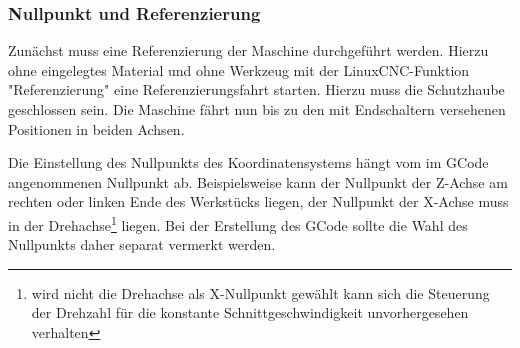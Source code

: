 \documentclass{\basedir/fablab-document}
\begin{document}
\subsubsection{Nullpunkt und Referenzierung}

Zunächst muss eine Referenzierung der Maschine durchgeführt werden. Hierzu ohne eingelegtes Material und ohne Werkzeug mit der LinuxCNC-Funktion "Referenzierung" eine Referenzierungsfahrt starten. Hierzu muss die Schutzhaube geschlossen sein. Die Maschine fährt nun bis zu den mit Endschaltern versehenen Positionen in beiden Achsen.

Die Einstellung des Nullpunkts des Koordinatensystems hängt vom im GCode angenommenen Nullpunkt ab. Beispielsweise kann der Nullpunkt der Z-Achse am rechten oder linken Ende des Werkstücks liegen, der Nullpunkt der X-Achse muss in der Drehachse\footnote{wird nicht die Drehachse als X-Nullpunkt gewählt kann sich die Steuerung der Drehzahl für die konstante Schnittgeschwindigkeit unvorhergesehen verhalten} liegen. Bei der Erstellung des GCode sollte die Wahl des Nullpunkts daher separat vermerkt werden.
\end{document}
